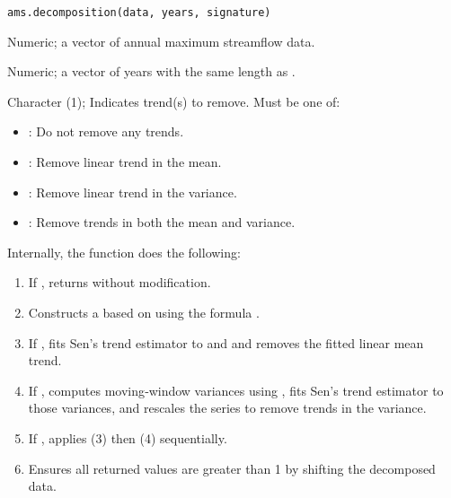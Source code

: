 \documentclass[a4paper]{book}
\begin{document}
%
\begin{Usage}
\begin{verbatim}
ams.decomposition(data, years, signature)
\end{verbatim}
\end{Usage}
%
\begin{Arguments}
\begin{ldescription}
\item[\code{data}] Numeric; a vector of annual maximum streamflow data.

\item[\code{years}] Numeric; a vector of years with the same length as .

\item[\code{signature}] Character (1); Indicates trend(s) to remove.  Must be one of:
\begin{itemize}

\item{} : Do not remove any trends.
\item{} : Remove linear trend in the mean.
\item{} : Remove linear trend in the variance.
\item{} : Remove trends in both the mean and variance.

\end{itemize}

\end{ldescription}
\end{Arguments}
%
\begin{Details}
Internally, the function does the following:
\begin{enumerate}

\item{} If , returns  without modification.
\item{} Constructs a  based on  using the formula .
\item{} If , fits Sen’s trend estimator to  and 
and removes the fitted linear mean trend.
\item{} If , computes moving‐window variances using ,
fits Sen’s trend estimator to those variances, and rescales the series to remove
trends in the variance.
\item{} If , applies (3) then (4) sequentially.
\item{} Ensures all returned values are greater than 1 by shifting the decomposed data.

\end{enumerate}

\end{Details}
\end{document}
